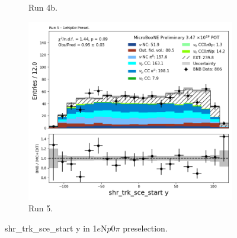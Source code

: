 \begin{figure}[H]
\begin{subfigure}[t]{0.32\linewidth}
        \caption{Run 4b.}
    \end{subfigure}%
    \hspace{0.2cm}%
    \begin{subfigure}[t]{0.32\linewidth}
        \includegraphics[width=\linewidth]{technote/Appendix_Preselection/Figures/1eNp0pi/Run5/shr_trk_sce_start_y_Run5_1eNp0pi_Presel.png}
        \caption{Run 5.}
    \end{subfigure}
    \caption{shr\_trk\_sce\_start y in 1$e$N$p$0$\pi$ preselection.}
\end{figure}

